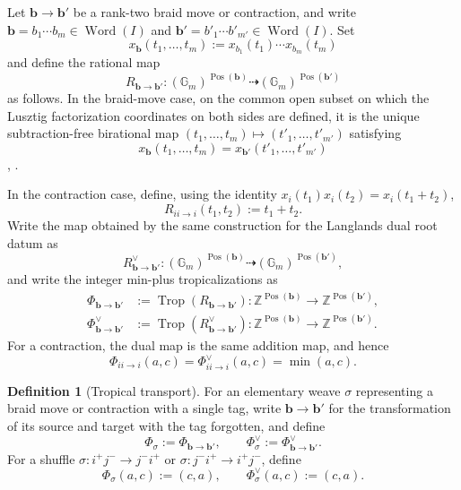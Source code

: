 \documentclass[10pt,a4paper]{article}
\theoremstyle{definition}
\newtheorem{definition}[theorem]{Definition}
\theoremstyle{remark}
\newcommand{\Gm}{\mathbb G_m}
\newcommand{\Word}{\operatorname{Word}}
\begin{document}
Let \(\mathbf b\to\mathbf b'\) be a rank-two braid move or contraction, and
write \(\mathbf b=b_1\cdots b_m\in\Word(I)\) and
\(\mathbf b'=b'_1\cdots b'_{m'}\in\Word(I)\).  Set
\[
 x_{\mathbf b}(t_1,\ldots,t_m)
 :=x_{b_1}(t_1)\cdots x_{b_m}(t_m)
\]
and define the rational map
\[
 R_{\mathbf b\to\mathbf b'}:
 (\Gm)^{\operatorname{Pos}(\mathbf b)}
 \dashrightarrow
 (\Gm)^{\operatorname{Pos}(\mathbf b')}
\]
as follows.  In the braid-move case, on the common open subset on which the
Lusztig factorization coordinates on both sides are defined, it is the unique
subtraction-free birational map
\((t_1,\ldots,t_m)\mapsto(t'_1,\ldots,t'_{m'})\) satisfying
\begin{equation}
 x_{\mathbf b}(t_1,\ldots,t_m)
 =x_{\mathbf b'}(t'_1,\ldots,t'_{m'})
 \label{eq:component-positive-lusztig-factorization}
\end{equation}
\cite[Proposition~2.5]{Lusztig1994},
\cite[Theorem~5.2 and Proposition~7.1]{BerensteinZelevinsky2001}.

In the contraction case, define, using the identity
\(x_i(t_1)x_i(t_2)=x_i(t_1+t_2)\),
\[
 R_{ii\to i}(t_1,t_2):=t_1+t_2.
\]
Write the map obtained by the same construction for the Langlands dual root
datum as
\[
 R_{\mathbf b\to\mathbf b'}^\vee:
 (\Gm)^{\operatorname{Pos}(\mathbf b)}
 \dashrightarrow
 (\Gm)^{\operatorname{Pos}(\mathbf b')},
\]
and write the integer min-plus tropicalizations as
\begin{equation}
 \begin{aligned}
  \Phi_{\mathbf b\to\mathbf b'}
  &:=\operatorname{Trop}(R_{\mathbf b\to\mathbf b'}):
  \mathbb Z^{\operatorname{Pos}(\mathbf b)}
  \longrightarrow
  \mathbb Z^{\operatorname{Pos}(\mathbf b')},\\
  \Phi_{\mathbf b\to\mathbf b'}^\vee
  &:=\operatorname{Trop}(R_{\mathbf b\to\mathbf b'}^\vee):
  \mathbb Z^{\operatorname{Pos}(\mathbf b)}
  \longrightarrow
  \mathbb Z^{\operatorname{Pos}(\mathbf b')}.
 \end{aligned}
 \label{eq:lusztig-weight-transport}
\end{equation}
For a contraction, the dual map is the same addition map, and hence
\[
 \Phi_{ii\to i}(a,c)
 =\Phi_{ii\to i}^\vee(a,c)=\min(a,c).
\]

\begin{definition}[Tropical transport]
\label{def:lusztig-weight-transport}
For an elementary weave \(\sigma\) representing a braid move or contraction
with a single tag, write \(\mathbf b\to\mathbf b'\) for the transformation of
its source and target with the tag forgotten, and define
\[
 \Phi_\sigma:=\Phi_{\mathbf b\to\mathbf b'},
 \qquad
 \Phi_\sigma^\vee:=\Phi_{\mathbf b\to\mathbf b'}^\vee.
\]
For a shuffle \(\sigma:i^+j^-\to j^-i^+\) or
\(\sigma:j^-i^+\to i^+j^-\), define
\begin{equation}
 \Phi_\sigma(a,c):=(c,a),
 \qquad
 \Phi_\sigma^\vee(a,c):=(c,a).
 \label{eq:shuffle-chart-transport}
\end{equation}
\end{definition}
\end{document}
